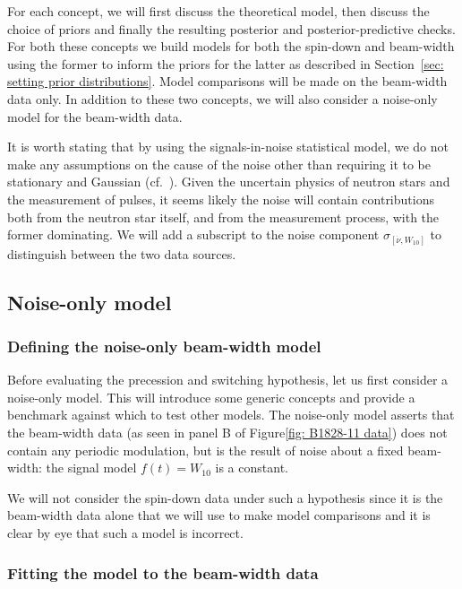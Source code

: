 \documentclass[../full_thesis/full_thesis.tex]{subfiles}
\begin{document}
For each concept, we will first discuss the theoretical model, then discuss the
choice of priors and finally the resulting posterior and posterior-predictive
checks. For both these concepts we build models for both the spin-down and
beam-width using the former to inform the priors for the latter as described in
Section~\ref{sec: setting prior distributions}. Model comparisons will be made on
the beam-width data only. In addition to these two concepts, we will also
consider a noise-only model for the beam-width data.

It is worth stating that by using the signals-in-noise statistical model, we do
not make any assumptions on the cause of the noise other than requiring it to
be stationary and Gaussian (cf.\ \citet{jaynes2003probability}). Given the
uncertain physics of neutron stars and the measurement of pulses, it seems
likely the noise will contain contributions both from the neutron star itself,
and from the measurement process, with the former dominating. We will add a
subscript to the noise component $\sigma_{[\dot{\nu}, W_{10}]}$ to distinguish
between the two data sources.

\subsection{Noise-only model}
\label{sec: noise-only}
\subsubsection{Defining the noise-only beam-width model}

Before evaluating the precession and switching hypothesis, let us first
consider a noise-only model.  This will introduce some generic concepts and
provide a benchmark against which to test other models. The noise-only model
asserts that the beam-width data (as seen in panel B of Figure\ref{fig: B1828-11
data}) does not contain any periodic modulation, but is the result of noise
about a fixed beam-width: the signal model $f(t) = W_{10}$ is a constant.

We will not consider the spin-down data under such a hypothesis since it is the
beam-width data alone that we will use to make model comparisons and it is
clear by eye that such a model is incorrect.

\subsubsection{Fitting the model to the beam-width data}
\label{sec: noise-only fitting the model}
\end{document}
